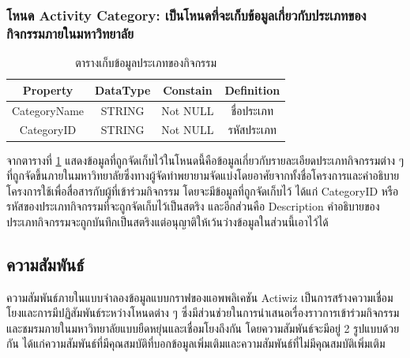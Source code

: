 \documentclass[14pt,oneside,openright,a4paper]{cpe-thai-project}
\begin{document}
    \subsubsection{โหนด Activity Category: เป็นโหนดที่จะเก็บข้อมูลเกี่ยวกับประเภทของกิจกรรมภายในมหาวิทยาลัย}
    \begin{table}[!h]\centering
      \begin{tabular}{|c|c|c|c|}
      \hline
      \rowcolor[HTML]{9FC5E8} 
      Property     & DataType & Constain & Definition \\ \hline
      CategoryName & STRING   & Not NULL & ชื่อประเภท \\ \hline
      CategoryID   & STRING   & Not NULL & รหัสประเภท \\ \hline
      \end{tabular}
      \caption{\centering ตารางเก็บข้อมูลประเภทของกิจกรรม}\label{tab:Activity Category Node}
    \end{table}
    จากตารางที่ \ref{tab:Activity Category Node} แสดงข้อมูลที่ถูกจัดเก็บไว้ในโหนดนี้คือข้อมูลเกี่ยวกับรายละเอียดประเภทกิจกรรมต่าง ๆ ที่ถูกจัดขึ้นภายในมหาวิทยาลัยซึ่งทางผู้จัดทำพยายามจัดแบ่งโดยอาศัยจากทั้งชื่อโครงการและคำอธิบายโครงการใช้เพื่อสื่อสารกับผู้ที่เข้าร่วมกิจกรรม โดยจะมีข้อมูลที่ถูกจัดเก็บไว้ ได้แก่ CategoryID หรือรหัสของประเภทกิจกรรมที่จะถูกจัดเก็บไว้เป็นสตริง และอีกส่วนคือ Description คำอธิบายของประเภทกิจกรรมจะถูกบันทึกเป็นสตริงแต่อนุญาติให้เว้นว่างข้อมูลในส่วนนี้เอาไว้ได้
    \subsection{ความสัมพันธ์}
    ความสัมพันธ์ภายในแบบจำลองข้อมูลแบบกราฟของแอพพลิเคชัน Actiwiz เป็นการสร้างความเชื่อมโยงและการมีปฏิสัมพันธ์ระหว่างโหนดต่าง ๆ ซึ่งมีส่วนช่วยในการนำเสนอเรื่องราวการเข้าร่วมกิจกรรมและชมรมภายในมหาวิทยาลัยแบบยืดหยุ่นและเชื่อมโยงถึงกัน โดยความสัมพันธ์จะมีอยู่ 2 รูปแบบด้วยกัน ได้แก่ความสัมพันธ์ที่มีคุณสมบัติที่บอกข้อมูลเพิ่มเติมและความสัมพันธ์ที่ไม่มีคุณสมบัติเพิ่มเติม
\end{document}
